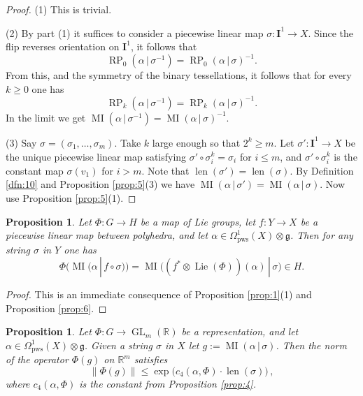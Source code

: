 \documentclass[10pt, a4paper]{amsart}
\newtheorem{prop}[equation]{Proposition}
\theoremstyle{definition}
\numberwithin{equation}{section}
\newcommand{\opn}{\operatorname}
\newcommand{\mfrak}[1]{\mathfrak{#1}}
\newcommand{\mbf}[1]{\mathbf{#1}}
\newcommand{\mrm}[1]{\mathrm{#1}}
\newcommand{\mbb}[1]{\mathbb{#1}}
\newcommand{\tup}[1]{\textup{#1}}
\newcommand{\norm}[1]{\lVert #1 \rVert}
\renewcommand{\vert}{\, | \,}
\newcommand{\R}{\mbb{R}}
\newcommand{\g}{\mfrak{g}}
\newcommand{\lb}{\linebreak}
\begin{document}
\begin{proof}
(1) This is trivial.

\medskip \noindent
(2) By part (1) it suffices to consider a piecewise linear map 
$\sigma : \mbf{I}^{1} \to X$.
Since the flip reverses orientation on $\mbf{I}^1$, it follows that 
\[ \opn{RP}_0(\alpha \vert \sigma^{-1}) = 
\opn{RP}_0(\alpha \vert \sigma)^{-1} . \]
{}From this, and the symmetry of the binary tessellations, it follows that for
every $k \geq 0$ one has
\[ \opn{RP}_{k}(\alpha \vert \sigma^{-1}) = 
\opn{RP}_{k}(\alpha \vert \sigma)^{-1} . \]
In the limit we get
$\opn{MI}(\alpha \vert \sigma^{-1}) = 
\opn{MI}(\alpha \vert \sigma)^{-1}$.

\medskip \noindent
(3) Say $\sigma  = (\sigma_1, \ldots, \sigma_m)$.
Take $k$ large enough so that $2^k \geq m$. Let
$\sigma' : \mbf{I}^1 \to X$ be the unique piecewise linear map satisfying
$\sigma' \circ \sigma^k_i = \sigma_i$ for $i \leq m$, and
$\sigma' \circ \sigma^k_i$ is the constant map $\sigma(v_1)$ for $i > m$.
Note that $\opn{len}(\sigma') = \opn{len}(\sigma)$.
By Definition \ref{dfn:10} and Proposition \ref{prop:5}(3) we have
$\opn{MI}(\alpha \vert \sigma') = 
\opn{MI}(\alpha \vert \sigma)$.
Now use Proposition \ref{prop:5}(1).
\end{proof}

\begin{prop} \label{prop:12}
Let $\Phi : G \to H$ be a map of Lie groups, let $f : Y \to X$ be a piecewise
linear map between polyhedra, and let
$\alpha \in \Omega^1_{\mrm{pws}}(X) \otimes \g$.
Then for any string $\sigma$ in $Y$ one has
\[ \Phi \bigl( \opn{MI}(\alpha \vert f \circ \sigma) \bigr) = 
\opn{MI} \bigl( (f^* \otimes \opn{Lie}(\Phi))(\alpha) \vert \sigma \bigr) 
\in H . \]
\end{prop}

\begin{proof}
This is an immediate consequence of Proposition \ref{prop:1}(1) and \lb
Proposition \ref{prop:6}.
\end{proof}

\begin{prop} \label{prop:13}
Let $\Phi : G \to \opn{GL}_m(\R)$ be a representation, and let
$\alpha \in \Omega_{\mrm{pws}}^1(X) \otimes \mfrak{g}$.
Given a string $\sigma$ in $X$ let $g := \opn{MI}(\alpha \vert \sigma)$.
Then the norm of the operator $\Phi(g)$ on $\R^m$ satisfies
\[ \norm{ \Phi(g) } \leq  \exp \bigl( c_4(\alpha, \Phi) \cdot
\opn{len}(\sigma) \bigr) \, , \]
where $c_4(\alpha, \Phi)$ is the constant from Proposition \tup{\ref{prop:4}}.
\end{prop}
\end{document}

